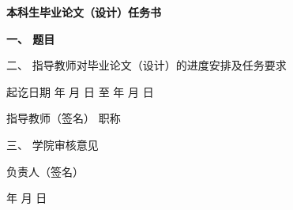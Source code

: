 {
  \setlength{\parindent}{0em}
  \linespread{1}

  \vspace*{-2.2em}

  {
    \centering
    \songti\erhao\bfseries
    本科生毕业论文（设计）任务书 \par
  }

  \vspace{2.1em}

  {
    \songti\xiaosi\bfseries
    一、 \; 题目 \; \underline{\makebox{\zjutitlec}}

    \vspace{1.1em}

    二、 \; 指导教师对毕业论文（设计）的进度安排及任务要求

    \vspace{15.5em}

    \hfill 起讫日期 \hspace{2em} 年 \hspace{1em} 月 \hspace{1em} 日 \; 至 \hspace{2em} 年 \hspace{1em} 月 \hspace{1em} 日

    \vspace{1.3em}

    \hfill 指导教师（签名） \; \underline{\hspace{4em}} \; 职称 \; \underline{\hspace{4em}}

    \vspace{2.35em}

    三、 \; 学院审核意见

    \vspace{13.95em}

    \hfill 负责人（签名） \; \underline{\hspace{4em}}

    \vspace{1.3em}

    \hfill \hspace{2em} 年 \hspace{1em} 月 \hspace{1em} 日 \par
  }
}
